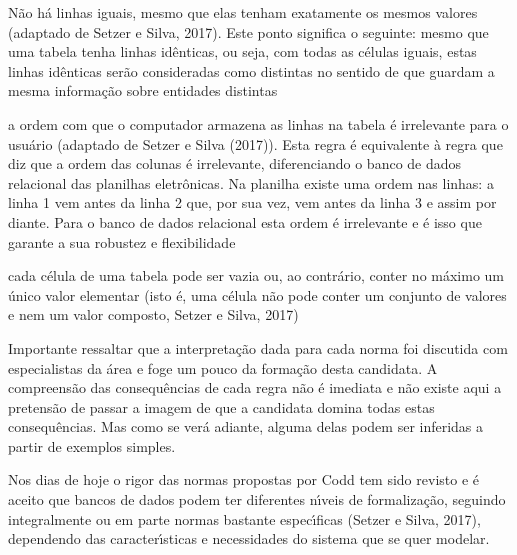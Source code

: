 \documentclass[
12pt,		%
openright,	%
twoside,  %
a4paper,			%
chapter=TITLE,		%
english,			%
french,				%
spanish,			%
brazil				%
]{USPSC-classe/USPSC}
\begin{document}
\begin{alineas}
\item N\~ao h\'a linhas iguais, mesmo que elas tenham exatamente os mesmos valores  (adaptado de Setzer e Silva, 2017). Este ponto significa o seguinte: mesmo que uma tabela tenha linhas id\^enticas, ou seja, com todas as c\'elulas iguais, estas linhas id\^enticas ser\~ao consideradas como distintas no sentido de que guardam a mesma informa\c{c}\~ao sobre entidades distintas
\item a ordem com que o computador armazena as linhas na tabela \'e irrelevante para o usu\'ario  (adaptado de Setzer e Silva (2017)). Esta regra \'e equivalente \`a regra que diz que a ordem das colunas \'e irrelevante, diferenciando o banco de dados relacional das planilhas eletr\^onicas. Na planilha existe uma ordem nas linhas: a linha 1 vem antes da linha 2 que, por sua vez, vem antes da linha 3 e assim por diante. Para o banco de dados relacional esta ordem \'e irrelevante e \'e isso que garante a sua robustez e flexibilidade
\item cada c\'elula de uma tabela pode ser vazia ou, ao contr\'ario, conter no m\'aximo um \'unico valor elementar (isto \'e, uma c\'elula n\~ao pode conter um conjunto de valores e nem um valor composto, Setzer e Silva, 2017)
\end{alineas}

Importante ressaltar que a interpreta\c{c}\~ao dada para cada norma foi discutida com especialistas da \'area e foge um pouco da forma\c{c}\~ao desta candidata. A compreens\~ao das consequ\^encias de cada regra n\~ao \'e imediata e n\~ao existe aqui a pretens\~ao de passar a imagem de que a candidata domina todas estas consequ\^encias. Mas como se ver\'a adiante, alguma delas podem ser inferidas a partir de exemplos simples.

















Nos dias de hoje o rigor das normas propostas por Codd tem sido revisto e \'e aceito que bancos de dados podem ter diferentes n\'{\i}veis de formaliza\c{c}\~ao, seguindo integralmente ou em parte normas bastante espec\'{\i}ficas (Setzer e Silva, 2017), dependendo das caracter\'{\i}sticas e necessidades do sistema que se quer modelar.
\end{document}
